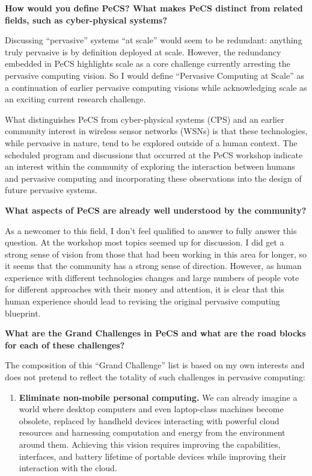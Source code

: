\begin{flushenumbf}

\item \textbf{How would you define PeCS? What makes PeCS distinct from
related fields, such as cyber-physical systems?}

Discussing ``pervasive'' systems ``at scale'' would seem to be redundant:
anything truly pervasive is by definition deployed at scale. However, the
redundancy embedded in PeCS highlights scale as a core challenge currently
arresting the pervasive computing vision. So I would define ``Pervasive
Computing at Scale'' as a continuation of earlier pervasive computing visions
while acknowledging scale as an exciting current research challenge.

What distinguishes PeCS from cyber-physical systems (CPS) and an earlier
community interest in wireless sensor networks (WSNs) is that these
technologies, while pervasive in nature, tend to be explored outside of a
human context. The scheduled program and discussions that occurred at the
PeCS workshop indicate an interest within the community of exploring the
interaction between humans and pervasive computing and incorporating these
observations into the design of future pervasive systems.

\item \textbf{What aspects of PeCS are already well understood by the
community?}

As a newcomer to this field, I don't feel qualified to answer to fully answer
this question. At the workshop most topics seemed up for discussion. I did
get a strong sense of vision from those that had been working in this area
for longer, so it seems that the community has a strong sense of direction.
However, as human experience with different technologies changes and large
numbers of people vote for different approaches with their money and
attention, it is clear that this human experience should lead to revising the
original pervasive computing blueprint.

\item \textbf{What are the Grand Challenges in PeCS and what are the road
blocks for each of these challenges?}

The composition of this ``Grand Challenge'' list is based on my own interests
and does not pretend to reflect the totality of such challenges in pervasive
computing:

\begin{enumerate}

\item \textbf{Eliminate non-mobile personal computing.} We can already
imagine a world where desktop computers and even laptop-class machines become
obsolete, replaced by handheld devices interacting with powerful cloud
resources and harnessing computation and energy from the environment around
them. Achieving this vision requires improving the capabilities, interfaces,
and battery lifetime of portable devices while improving their interaction
with the cloud.


\end{enumerate}
\end{flushenumbf}
